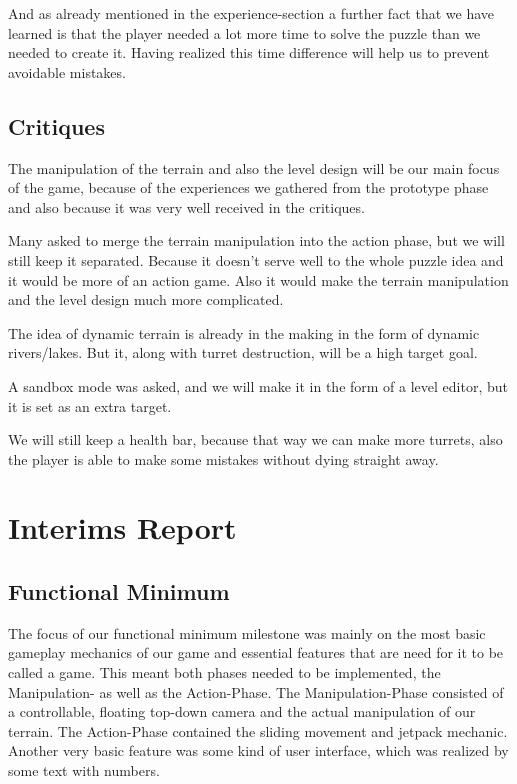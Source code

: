 \documentclass[12pt, letterpaper]{scrartcl}
\begin{document}
	And as already mentioned in the experience-section a further fact that we have learned is that the player needed a lot more time to solve the puzzle than we needed to create it. Having realized this time difference will help us to prevent avoidable mistakes.
	
	\subsection{Critiques}
	The manipulation of the terrain and also the level design will be our main focus of the game, because of the experiences we gathered from the prototype phase and also because it was very well received in the critiques.
	
	Many asked to merge the terrain manipulation into the action phase, but we will still keep it separated. Because it doesn't serve well to the whole puzzle idea and it would be more of an action game. Also it would make the terrain manipulation and the level design much more complicated.
	
	The idea of dynamic terrain is already in the making in the form of dynamic rivers/lakes. But it, along with turret destruction, will be a high target goal.
	
	A sandbox mode was asked, and we will make it in the form of a level editor, but it is set as an extra target.
	
	We will still keep a health bar, because that way we can make more turrets, also the player is able to make some mistakes without dying straight away.
	
	\section{Interims Report}
	\subsection{Functional Minimum}
	\label{sec:functionalMinimum}
	The focus of our functional minimum milestone was mainly on the most basic gameplay mechanics of our game and essential features that are need for it to be called a game. This meant both phases needed to be implemented, the Manipulation- as well as the Action-Phase. The Manipulation-Phase consisted of a controllable, floating top-down camera and the actual manipulation of our terrain. The Action-Phase contained the sliding movement and jetpack mechanic. Another very basic feature was some kind of user interface, which was realized by some text with numbers.
	
\end{document}
